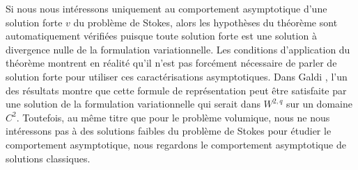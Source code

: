 Si nous nous intéressons uniquement au comportement asymptotique d'une solution forte $v$ du problème de Stokes, alors les hypothèses du théorème sont automatiquement vérifiées puisque toute solution forte est une solution à divergence nulle de la formulation variationnelle.
Les conditions d'application du théorème montrent en réalité qu'il n'est pas forcément nécessaire de parler de solution forte pour utiliser ces caractérisations asymptotiques. Dans Galdi \cite{Galdi}, l'un des résultats montre que cette formule de représentation peut être satisfaite par une solution de la formulation variationnelle qui serait dans $W^{2,q}$ sur un domaine $C^2$. 
Toutefois, au même titre que pour le problème volumique, nous ne nous intéressons pas à des solutions faibles du problème de Stokes pour étudier le comportement asymptotique, nous regardons le comportement asymptotique de solutions classiques.

